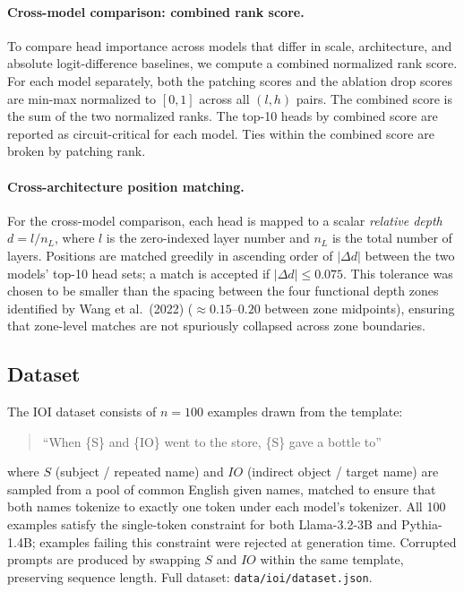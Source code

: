 \documentclass[11pt,a4paper]{article}
\begin{document}
\paragraph{Cross-model comparison: combined rank score.}
To compare head importance across models that differ in scale, architecture, and
absolute logit-difference baselines, we compute a combined normalized rank score. For
each model separately, both the patching scores and the ablation drop scores are
min-max normalized to $[0, 1]$ across all $(l, h)$ pairs. The combined score is the
sum of the two normalized ranks. The top-10 heads by combined score are reported as
circuit-critical for each model. Ties within the combined score are broken by patching
rank.

\paragraph{Cross-architecture position matching.}
For the cross-model comparison, each head is mapped to a scalar \emph{relative depth}
$d = l / n_L$, where $l$ is the zero-indexed layer number and $n_L$ is the total
number of layers. Positions are matched greedily in ascending order of $|\Delta d|$
between the two models' top-10 head sets; a match is accepted if $|\Delta d| \leq
0.075$. This tolerance was chosen to be smaller than the spacing between the four
functional depth zones identified by Wang et al.\ (2022) (${\approx}0.15$--$0.20$
between zone midpoints), ensuring that zone-level matches are not spuriously collapsed
across zone boundaries.

\subsection{Dataset}
\label{sec:dataset}

The IOI dataset consists of $n = 100$ examples drawn from the template:

\begin{quote}
  ``When \{S\} and \{IO\} went to the store, \{S\} gave a bottle to''
\end{quote}

where $S$ (subject / repeated name) and $\mathit{IO}$ (indirect object / target name)
are sampled from a pool of common English given names, matched to ensure that both
names tokenize to exactly one token under each model's tokenizer. All 100 examples
satisfy the single-token constraint for both Llama-3.2-3B and Pythia-1.4B; examples
failing this constraint were rejected at generation time. Corrupted prompts are
produced by swapping $S$ and $\mathit{IO}$ within the same template, preserving
sequence length. Full dataset: \texttt{data/ioi/dataset.json}.
\end{document}
